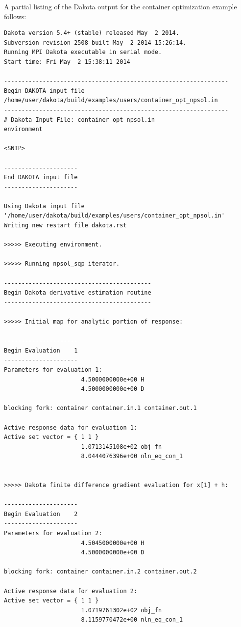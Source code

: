 \clearpage

A partial listing of the Dakota output for the container optimization
example follows:
\begin{small}
\begin{verbatim}
Dakota version 5.4+ (stable) released May  2 2014.
Subversion revision 2508 built May  2 2014 15:26:14.
Running MPI Dakota executable in serial mode.
Start time: Fri May  2 15:38:11 2014

----------------------------------------------------------------
Begin DAKOTA input file
/home/user/dakota/build/examples/users/container_opt_npsol.in
----------------------------------------------------------------
# Dakota Input File: container_opt_npsol.in
environment

<SNIP>

---------------------
End DAKOTA input file
---------------------

Using Dakota input file '/home/user/dakota/build/examples/users/container_opt_npsol.in'
Writing new restart file dakota.rst

>>>>> Executing environment.

>>>>> Running npsol_sqp iterator.

------------------------------------------
Begin Dakota derivative estimation routine
------------------------------------------

>>>>> Initial map for analytic portion of response:

---------------------
Begin Evaluation    1
---------------------
Parameters for evaluation 1:
                      4.5000000000e+00 H
                      4.5000000000e+00 D

blocking fork: container container.in.1 container.out.1

Active response data for evaluation 1:
Active set vector = { 1 1 }
                      1.0713145108e+02 obj_fn
                      8.0444076396e+00 nln_eq_con_1


>>>>> Dakota finite difference gradient evaluation for x[1] + h:

---------------------
Begin Evaluation    2
---------------------
Parameters for evaluation 2:
                      4.5045000000e+00 H
                      4.5000000000e+00 D

blocking fork: container container.in.2 container.out.2

Active response data for evaluation 2:
Active set vector = { 1 1 }
                      1.0719761302e+02 obj_fn
                      8.1159770472e+00 nln_eq_con_1



\end{verbatim}
\end{small}
